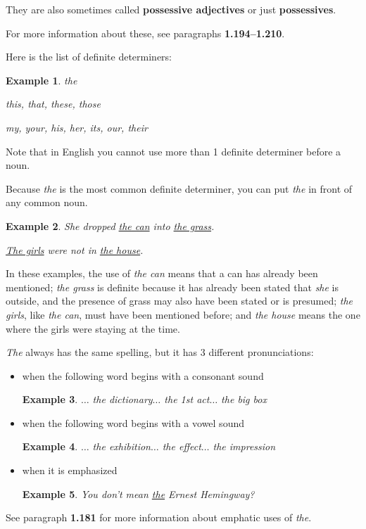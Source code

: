 \documentclass[oneside]{book}
\numberwithin{equation}{section}
\newtheorem{example}{Example}[section]
\begin{document}
They are also sometimes called \textbf{possessive adjectives} or just \textbf{possessives}.

For more information about these, see paragraphs \textbf{1.194--1.210}.

%
Here is the list of definite determiners:
\begin{example}
    the
    
    this, that, these, those
    
    my, your, his, her, its, our, their
\end{example}
Note that in English you cannot use more than 1 definite determiner before a noun.

%
\noindent{} Because \textit{the} is the most common definite determiner, you can put \textit{the} in front of any common noun.
\begin{example}
    She dropped \underline{the can} into \underline{the grass}.
    
    \underline{The girls} were not in \underline{the house}.
\end{example}
In these examples, the use of \textit{the can} means that a can has already been mentioned; \textit{the grass} is definite because it has already been stated that \textit{she} is outside, and the presence of grass may also have been stated or is presumed; \textit{the girls}, like \textit{the can}, must have been mentioned before; and \textit{the house} means the one where the girls were staying at the time.

%
\noindent{} \textit{The} always has the same spelling, but it has 3 different pronunciations:
\begin{itemize}
    \item {} when the following word begins with a consonant sound
    \begin{example}
        $\ldots$ the dictionary$\ldots$ the 1st act$\ldots$ the big box
    \end{example}
    \item {} when the following word begins with a vowel sound
    \begin{example}
        $\ldots$ the exhibition$\ldots$ the effect$\ldots$ the impression
    \end{example}
    \item {} when it is emphasized
    \begin{example}
        You don't mean \underline{the} Ernest Hemingway?
    \end{example}
\end{itemize}
See paragraph \textbf{1.181} for more information about emphatic uses of \textit{the}.
\end{document}
